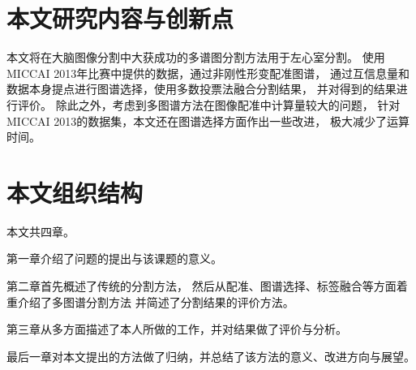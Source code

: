 \section{本文研究内容与创新点}

本文将在大脑图像分割中大获成功的多谱图分割方法用于左心室分割。
使用MICCAI 2013年比赛中提供的数据，通过非刚性形变配准图谱，
通过互信息量和数据本身提点进行图谱选择，使用多数投票法融合分割结果，
并对得到的结果进行评价。
除此之外，考虑到多图谱方法在图像配准中计算量较大的问题，
针对MICCAI 2013的数据集，本文还在图谱选择方面作出一些改进，
极大减少了运算时间。

\section{本文组织结构}
本文共四章。

第一章介绍了问题的提出与该课题的意义。

第二章首先概述了传统的分割方法，
然后从配准、图谱选择、标签融合等方面着重介绍了多图谱分割方法
并简述了分割结果的评价方法。

第三章从多方面描述了本人所做的工作，并对结果做了评价与分析。

最后一章对本文提出的方法做了归纳，并总结了该方法的意义、改进方向与展望。

